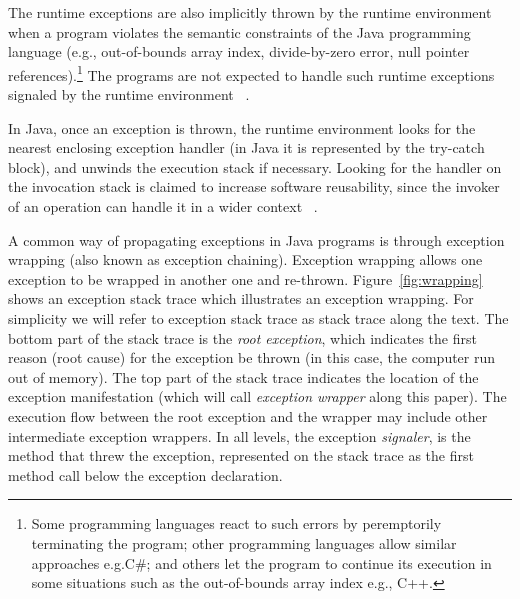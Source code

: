 \documentclass[conference]{IEEEtran}
\begin{document}
The runtime exceptions are also implicitly thrown by the runtime environment when a program violates 
the semantic constraints of the Java programming language (e.g., out-of-bounds array index, divide-by-zero 
error, null pointer references).\footnote{Some programming languages react to such errors by peremptorily terminating the program; 
other programming languages allow similar approaches e.g.C\#; and others let the program to continue
 its execution in some situations such as the out-of-bounds array index e.g., C++. }  
The programs are not expected to handle such runtime exceptions signaled by the runtime environment ~\cite{gosling2000java}. 





In Java, once an exception is thrown, the runtime environment looks for the nearest enclosing exception handler
(in Java it is represented by the try-catch block), and unwinds the execution stack if necessary.
 Looking for the handler on the invocation stack is claimed to increase software reusability, 
since the invoker of an operation can handle it in a wider context ~\cite{miller1997issues}.

 A common way of  propagating exceptions in Java programs is through exception wrapping
 (also known as exception chaining). Exception wrapping allows one exception 
to be wrapped in another one and re-thrown. Figure~\ref{fig:wrapping} shows 
an exception stack trace which illustrates an exception wrapping. 
For simplicity we will refer to exception stack trace as stack trace along the text.
The bottom part of the stack trace is the \emph{root exception}, which indicates
the first reason (root cause) for the exception be thrown (in this case, the computer run out of
memory). The top part of the stack trace indicates the location of the exception
manifestation (which will call \emph{exception wrapper} along this paper). The
execution flow  between the root exception and the wrapper may
include other intermediate exception wrappers. In all levels, the exception
\emph{signaler}, is the method that threw the exception, represented on the
stack trace as the first method call below the exception declaration.
\end{document}
